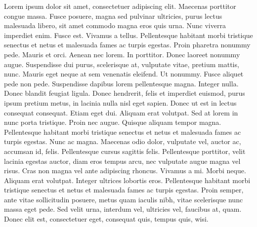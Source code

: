 \documentclass{biorxiv}
\begin{document}
\begin{methods}
Lorem ipsum dolor sit amet, consectetuer adipiscing elit. Maecenas porttitor
congue massa. Fusce posuere, magna sed pulvinar ultricies, purus lectus
malesuada libero, sit amet commodo magna eros quis urna. Nunc viverra
imperdiet enim. Fusce est. Vivamus a tellus. Pellentesque habitant morbi
tristique senectus et netus et malesuada fames ac turpis egestas. Proin
pharetra nonummy pede. Mauris et orci. Aenean nec lorem. In porttitor. Donec
laoreet nonummy augue. Suspendisse dui purus, scelerisque at, vulputate vitae,
pretium mattis, nunc. Mauris eget neque at sem venenatis eleifend. Ut nonummy.
Fusce aliquet pede non pede. Suspendisse dapibus lorem pellentesque magna.
Integer nulla. Donec blandit feugiat ligula. Donec hendrerit, felis et
imperdiet euismod, purus ipsum pretium metus, in lacinia nulla nisl eget
sapien. Donec ut est in lectus consequat consequat. Etiam eget dui. Aliquam
erat volutpat. Sed at lorem in nunc porta tristique. Proin nec augue. Quisque
aliquam tempor magna. Pellentesque habitant morbi tristique senectus et netus
et malesuada fames ac turpis egestas. Nunc ac magna. Maecenas odio dolor,
vulputate vel, auctor ac, accumsan id, felis. Pellentesque cursus sagittis
felis. Pellentesque porttitor, velit lacinia egestas auctor, diam eros tempus
arcu, nec vulputate augue magna vel risus. Cras non magna vel ante adipiscing
rhoncus. Vivamus a mi. Morbi neque. Aliquam erat volutpat. Integer ultrices
lobortis eros. Pellentesque habitant morbi tristique senectus et netus et
malesuada fames ac turpis egestas. Proin semper, ante vitae sollicitudin
posuere, metus quam iaculis nibh, vitae scelerisque nunc massa eget pede. Sed
velit urna, interdum vel, ultricies vel, faucibus at, quam. Donec elit est,
consectetuer eget, consequat quis, tempus quis, wisi.


\end{methods}
\end{document}
